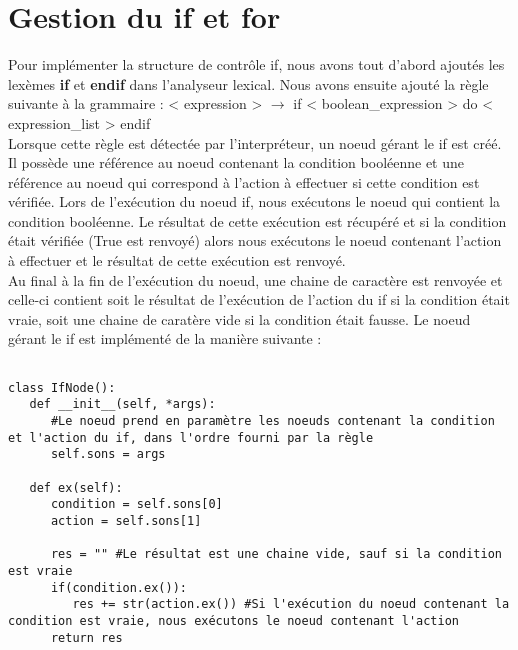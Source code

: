 \documentclass[a4paper,10pt]{article}
\begin{document}
\section{Gestion du \textbf{if} et \textbf{for}}
Pour implémenter la structure de contrôle \textrm{if}, nous avons tout d'abord ajoutés les lexèmes \textbf{if} et \textbf{endif} dans l'analyseur lexical. Nous avons ensuite ajouté la 
règle suivante à la grammaire : < expression > $\rightarrow$ if < boolean\_expression > do < expression\_list > endif \\
Lorsque cette règle est détectée par l'interpréteur, un noeud gérant le if est créé. Il possède une référence au noeud contenant la condition booléenne et une référence au noeud qui correspond
à l'action à effectuer si cette condition est vérifiée. Lors de l'exécution du noeud \textrm{if}, nous exécutons le noeud qui contient la condition booléenne. Le résultat de cette exécution
est récupéré et si la condition était vérifiée (\textrm{True} est renvoyé) alors nous exécutons le noeud contenant l'action à effectuer et le résultat de cette exécution est renvoyé. \\
Au final à la fin de l'exécution du noeud, une chaine de caractère est renvoyée et celle-ci contient soit le résultat de l'exécution de l'action du if si la condition était vraie, soit une
chaine de caratère vide si la condition était fausse. 
\newline
Le noeud gérant le \textrm{if} est implémenté de la manière suivante : \\
\begin{verbatim}

class IfNode():
   def __init__(self, *args):
      #Le noeud prend en paramètre les noeuds contenant la condition et l'action du if, dans l'ordre fourni par la règle
      self.sons = args
         
   def ex(self):
      condition = self.sons[0]
      action = self.sons[1]

      res = "" #Le résultat est une chaine vide, sauf si la condition est vraie
      if(condition.ex()):
         res += str(action.ex()) #Si l'exécution du noeud contenant la condition est vraie, nous exécutons le noeud contenant l'action
      return res
 
\end{verbatim}
\end{document}
